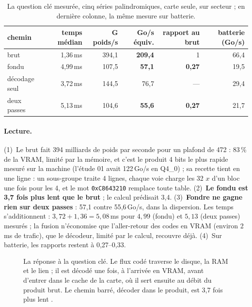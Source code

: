 \begin{table}[ht]
\centering\small
\caption[La question clé, mesurée]{La question clé mesurée, cinq séries palindromiques, carte seule, sur secteur \mes ; en dernière colonne, la même mesure sur batterie.}
\label{tab:ent-gemv}
\begin{tabular}{@{}lrrrrr@{}}
\toprule
chemin & temps médian & G poids/s & Go/s équiv. & rapport au brut & batterie (Go/s) \\
\midrule
brut & 1,36\,ms & 394,1 & \textbf{209,4} & 1 & 66,4 \\
fondu & 4,99\,ms & 107,5 & \textbf{57,1} & \textbf{0,27} & 19,5 \\
décodage seul & 3,72\,ms & 144,5 & 76,7 & --- & 29,4 \\
deux passes & 5,13\,ms & 104,6 & \textbf{55,6} & \textbf{0,27} & 21,7 \\
\bottomrule
\end{tabular}
\end{table}

\paragraph{Lecture.} (1)~Le brut fait 394 milliards de poids par seconde pour un plafond de 472 : 83\,\% de la VRAM, limité par la mémoire, et c'est le produit 4 bits le plus rapide mesuré sur la machine (l'étude 01 avait 122\,Go/s en Q4\_0) ; sa recette tient en une ligne : un sous-groupe traite 4 lignes, chaque voie charge les 32 $x$ d'un bloc une fois pour les 4, et le mot \texttt{0xC8643210} remplace toute table. (2)~\textbf{Le fondu est 3,7 fois plus lent que le brut} ; le calcul prédisait 3,4. (3)~\textbf{Fondre ne gagne rien sur deux passes} : 57,1 contre 55,6\,Go/s, dans la dispersion. Les temps s'additionnent : $3{,}72 + 1{,}36 = 5{,}08$\,ms pour $4{,}99$ (fondu) et $5{,}13$ (deux passes) mesurés ; la fusion n'économise que l'aller-retour des codes en VRAM (environ 2\,ms de trafic), que le décodeur, limité par le calcul, recouvre déjà. (4)~Sur batterie, les rapports restent à 0,27--0,33.

\begin{figure}[ht]
\centering
\resizebox{\linewidth}{!}{\SchemaOuDecoder}
\caption[Où décoder : à l'arrivée du tronçon]{La réponse à la question clé. Le flux codé traverse le disque, la RAM et le lien ; il est décodé une fois, à l'arrivée en VRAM, avant d'entrer dans le cache de la carte, où il sert ensuite au débit du produit brut. Le chemin barré, décoder dans le produit, est 3,7 fois plus lent \mes.}
\label{fig:ent-ou}
\end{figure}

